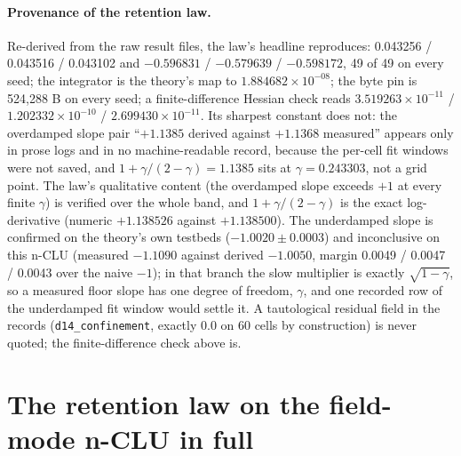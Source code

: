 \documentclass{article} %
\newcommand{\sci}[2]{\ensuremath{#1\times10^{#2}}}
\begin{document}
\paragraph{Provenance of the retention law.} Re-derived from the raw result files, the law's
headline reproduces: 0.043256 / 0.043516 / 0.043102 and $-0.596831$ / $-0.579639$ / $-0.598172$,
49 of 49 on every seed; the integrator is the theory's map to \sci{1.884682}{-08}; the byte pin is
524,288 B on every seed; a finite-difference Hessian check reads \sci{3.519263}{-11} /
\sci{1.202332}{-10} / \sci{2.699430}{-11}. %
Its sharpest constant does not: the overdamped slope pair ``$+1.1385$ derived against $+1.1368$
measured'' appears only in prose logs and in no machine-readable record, because the per-cell fit
windows were not saved, and $1+\gamma/(2-\gamma)=1.1385$ sits at $\gamma=0.243303$, not a grid
point. The law's qualitative content (the overdamped slope exceeds $+1$ at every finite $\gamma$)
is verified over the whole band, and $1+\gamma/(2-\gamma)$ is the exact log-derivative (numeric
$+1.138526$ against $+1.138500$). The underdamped slope is confirmed on the theory's own testbeds
($-1.0020\pm0.0003$) and inconclusive on this n-CLU (measured $-1.1090$ against derived $-1.0050$,
margin 0.0049 / 0.0047 / 0.0043 over the naive $-1$); in that branch the slow multiplier is exactly
$\sqrt{1-\gamma}$, so a measured floor slope has one degree of freedom, $\gamma$, and one recorded row
of the underdamped fit window would settle it. A tautological residual field in the records
(\texttt{d14\_confinement}, exactly 0.0 on 60 cells by construction) is never quoted; the
finite-difference check above is. %

\section{The retention law on the field-mode n-CLU in full}
\label{app:physics}
\end{document}
